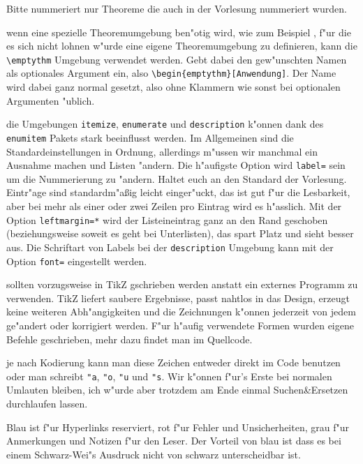 \documentclass[paper=A4, twoside, chapterprefix=true, bibliography=totoc, headsepline]{scrbook}
\begin{document}
\begin{description}[font=\normalfont\itshape]
	Bitte nummeriert nur Theoreme die auch in der Vorlesung nummeriert wurden.
\item[Spezielle Theoreme:]
	wenn eine spezielle Theoremumgebung ben"otig wird, wie zum Beispiel , f"ur die es sich nicht lohnen w"urde eine eigene Theoremumgebung zu definieren, kann die \verb|\emptythm| Umgebung verwendet werden.
	Gebt dabei den gew"unschten Namen als optionales Argument ein, also \verb|\begin{emptythm}[Anwendung]|.
	Der Name wird dabei ganz normal gesetzt, also ohne Klammern wie sonst bei optionalen Argumenten "ublich.
\item[Listen und Aufz"ahlungen:]
	die Umgebungen \verb|itemize|, \verb|enumerate| und \verb|description| k"onnen dank des \verb|enumitem| Pakets stark beeinflusst werden.
	Im Allgemeinen sind die Standardeinstellungen in Ordnung, allerdings m"ussen wir manchmal ein Ausnahme machen und Listen "andern.
	Die h"aufigste Option wird \verb|label=| sein um die Nummerierung zu "andern.
	Haltet euch an den Standard der Vorlesung.
	Eintr"age sind standardm"a\ss ig leicht einger"uckt, das ist gut f"ur die Lesbarkeit, aber bei mehr als einer oder zwei Zeilen pro Eintrag wird es h"asslich.
	Mit der Option \verb|leftmargin=*| wird der Listeineintrag ganz an den Rand geschoben (beziehungsweise soweit es geht bei Unterlisten), das spart Platz und sieht besser aus.
	Die Schriftart von Labels bei der \verb|description| Umgebung kann mit der Option \verb|font=| eingestellt werden.
\item[Zeichungen:]
	sollten vorzugsweise in TikZ gschrieben werden anstatt ein externes Programm zu verwenden.
	TikZ liefert saubere Ergebnisse, passt nahtlos in das Design, erzeugt keine weiteren Abh"angigkeiten und die Zeichnungen k"onnen jederzeit von jedem ge"andert oder korrigiert werden.
	F"ur h"aufig verwendete Formen wurden eigene Befehle geschrieben, mehr dazu findet man im Quellcode.
\item[Umlaute und "s:]
	je nach Kodierung kann man diese Zeichen entweder direkt im Code benutzen oder man schreibt \verb|"a|, \verb|"o|, \verb|"u| und \verb|"s|.
	Wir k"onnen f"ur's Erste bei normalen Umlauten bleiben, ich w"urde aber trotzdem am Ende einmal Suchen\&Ersetzen durchlaufen lassen.
\item[Farben:]
	Blau ist f"ur Hyperlinks reserviert, rot f"ur Fehler und Unsicherheiten, grau f"ur Anmerkungen und Notizen f"ur den Leser.
	Der Vorteil von blau ist dass es bei einem Schwarz-Wei"s Ausdruck nicht von schwarz unterscheidbar ist.
\item[Randnotizen:]

\end{description}
\end{document}
